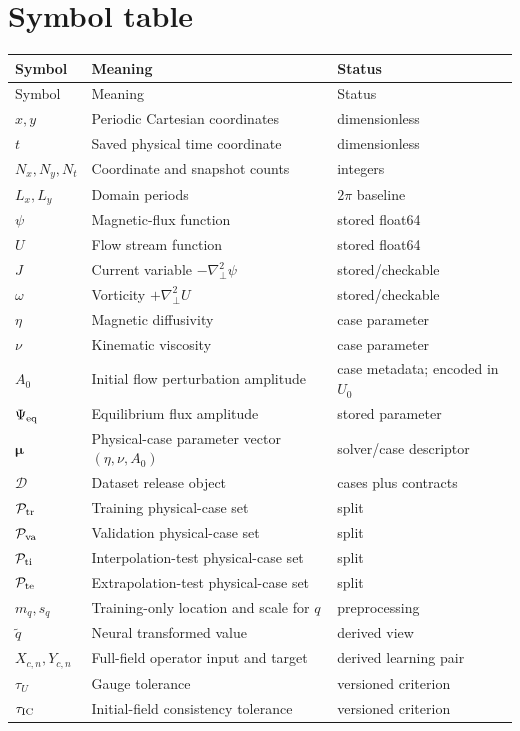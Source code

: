 \documentclass[11pt]{article}
\newcommand{\vect}[1]{\bm{#1}}
\newcommand{\Lap}{\nabla_{\!\perp}^{2}}
\begin{document}
\section{Symbol table}
\label{app:symbols}

\small
\begin{longtable}{p{}p{}p{}}
\toprule
Symbol & Meaning & Status \\
\midrule
\endfirsthead
\toprule
Symbol & Meaning & Status \\
\midrule
\endhead
$x,y$ & Periodic Cartesian coordinates & dimensionless \\
$t$ & Saved physical time coordinate & dimensionless \\
$N_x,N_y,N_t$ & Coordinate and snapshot counts & integers \\
$L_x,L_y$ & Domain periods & $2\pi$ baseline \\
$\psi$ & Magnetic-flux function & stored float64 \\
$U$ & Flow stream function & stored float64 \\
$J$ & Current variable $-\Lap\psi$ & stored/checkable \\
$\omega$ & Vorticity $+\Lap U$ & stored/checkable \\
$\eta$ & Magnetic diffusivity & case parameter \\
$\nu$ & Kinematic viscosity & case parameter \\
$A_0$ & Initial flow perturbation amplitude & case metadata; encoded in $U_0$ \\
$\Psi_{\rm eq}$ & Equilibrium flux amplitude & stored parameter \\
$\vect\mu$ & Physical-case parameter vector $(\eta,\nu,A_0)$ & solver/case descriptor \\
$\mathcal D$ & Dataset release object & cases plus contracts \\
$\mathcal P_{\rm tr}$ & Training physical-case set & split \\
$\mathcal P_{\rm va}$ & Validation physical-case set & split \\
$\mathcal P_{\rm ti}$ & Interpolation-test physical-case set & split \\
$\mathcal P_{\rm te}$ & Extrapolation-test physical-case set & split \\
$m_q,s_q$ & Training-only location and scale for $q$ & preprocessing \\
$\widetilde q$ & Neural transformed value & derived view \\
$X_{c,n},Y_{c,n}$ & Full-field operator input and target & derived learning pair \\
$\tau_U$ & Gauge tolerance & versioned criterion \\
$\tau_{\rm IC}$ & Initial-field consistency tolerance & versioned criterion \\
\bottomrule
\end{longtable}
\normalsize
\end{document}
